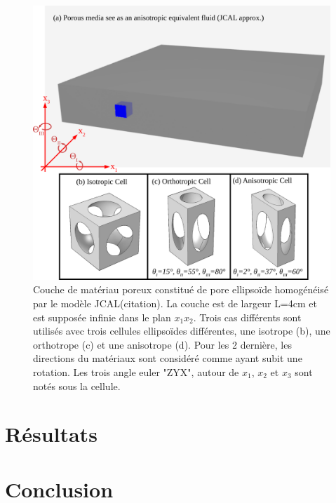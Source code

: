 \documentclass[12pt]{report}
\begin{document}
    
    \begin{figure}[ht!]
        \centering
        \includegraphics[scale=0.7]{Material_2.png}
        \caption{Couche de matériau poreux constitué de pore ellipsoïde homogénéisé par le modèle JCAL(citation). La couche est de largeur L=4cm et est supposée infinie dans le plan $x_1x_2$. Trois cas différents sont utilisés avec trois cellules ellipsoïdes différentes, une isotrope (b), une orthotrope (c) et une anisotrope (d). Pour les 2 dernière, les directions du matériaux sont considéré comme ayant subit une rotation. Les trois angle euler "ZYX", autour de $x_1$, $x_2$ et $x_3$ sont notés sous la cellule. }
        \label{Porous_Mat}
    \end{figure}
    
\chapter{Résultats}
\label{Ch_Res}


\chapter*{Conclusion}
\end{document}
